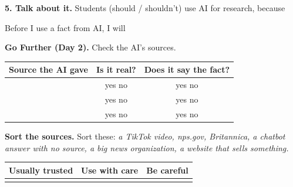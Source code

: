 \documentclass[11pt]{article}
\begin{document}
\newpage

{\large\textbf{5. Talk about it.}} Students (should / shouldn't) use AI for research, because

\vspace{0.6em}

\vspace{0.6em}
Before I use a fact from AI, I will 

\vspace{1.4em}
{\large\textbf{Go Further (Day 2).}} Check the AI's sources.

\vspace{0.3em}
\begin{tabular}{|R{3.0in}|c|c|}
\hline
\textbf{Source the AI gave} & \textbf{Is it real?} & \textbf{Does it say the fact?} \\ \hline
{} & yes \quad no & yes \quad no \\[0.6em] \hline
 & yes \quad no & yes \quad no \\[0.6em] \hline
 & yes \quad no & yes \quad no \\[0.6em] \hline
\end{tabular}

\vspace{1.0em}
{\large\textbf{Sort the sources.}} Sort these: \textit{a TikTok video, nps.gov, Britannica, a chatbot answer with no source, a big news organization, a website that sells something.}

\vspace{0.3em}
\begin{tabular}{|R{2.2in}|R{2.2in}|R{2.2in}|}
\hline
\textbf{Usually trusted} & \textbf{Use with care} & \textbf{Be careful} \\ \hline
{} &  &  \\[2.6em] \hline
\end{tabular}

\vspace{1.1em}
\end{document}
